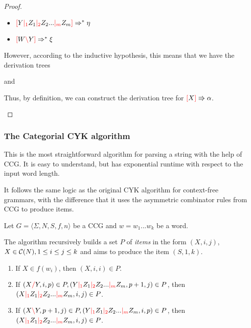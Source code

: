 \documentclass[main.tex]{subfiles}
\begin{document}
\begin{proof}
\begin{itemize}
\begin{itemize}
                \item $\textcolor{red}{[} Y \textcolor{red}{|_{1}} Z_1 \textcolor{red}{|_{2}} Z_2 ... \textcolor{red}{|_{m}} Z_m \textcolor{red}{]} \Rightarrow^* \eta$
                \item $\textcolor{red}{[} W \textcolor{red}{\backslash} Y \textcolor{red}{]} \Rightarrow^* \xi$
            \end{itemize}
            However, according to the inductive hypothesis, this means that we
            have the derivation trees
            \begin{center}
                and
            \end{center}
            Thus, by definition, we can construct the derivation tree
            for $\textcolor{red}{[} X \textcolor{red}{]} \Rrightarrow \alpha$.
    \end{itemize}
\end{proof}

\subsubsection{The Categorial CYK algorithm}\label{sec:cyk}

This is the most straightforward algorithm for parsing a string with the help
of CCG. It is easy to understand, but has exponential runtime with respect to
the input word length.

It follows the same logic as the original CYK algorithm for context-free
grammars, with the difference that it uses the asymmetric combinator rules
from CCG to produce items.

Let $ G = \langle \Sigma, N, S, f, n \rangle $ be a CCG and $w = w_1 ... w_k$
be a word.

The algorithm recursively builds a set $P$ of \emph{items} in the form
$(X, i, j)$, $X \in \mathcal{C}( N ), 1 \leq i \leq j \leq k$ and aims to produce the item
$(S, 1, k)$.

\begin{enumerate}
\label{cyk:rules}
    \item If $X \in f(w_i)$, then $(X, i, i) \in P$.
    \item If $(X \textcolor{red}{/} Y, i, p) \in P, (Y \textcolor{red}{|_{1}} Z_1 \textcolor{red}{|_{2}} Z_2 ... \textcolor{red}{|_{m}} Z_m, p + 1, j) \in P$,
        then $(X \textcolor{red}{|_{1}} Z_1 \textcolor{red}{|_{2}} Z_2 ... \textcolor{red}{|_{m}} Z_m, i, j) \in P$.
    \item If $(X \textcolor{red}{\backslash} Y, p + 1, j) \in P, (Y \textcolor{red}{|_{1}} Z_1 \textcolor{red}{|_{2}} Z_2 ... \textcolor{red}{|_{m}} Z_m, i, p) \in P$,
        then $(X \textcolor{red}{|_{1}} Z_1 \textcolor{red}{|_{2}} Z_2 ... \textcolor{red}{|_{m}} Z_m, i, j) \in P$.
\end{enumerate}
\end{document}
